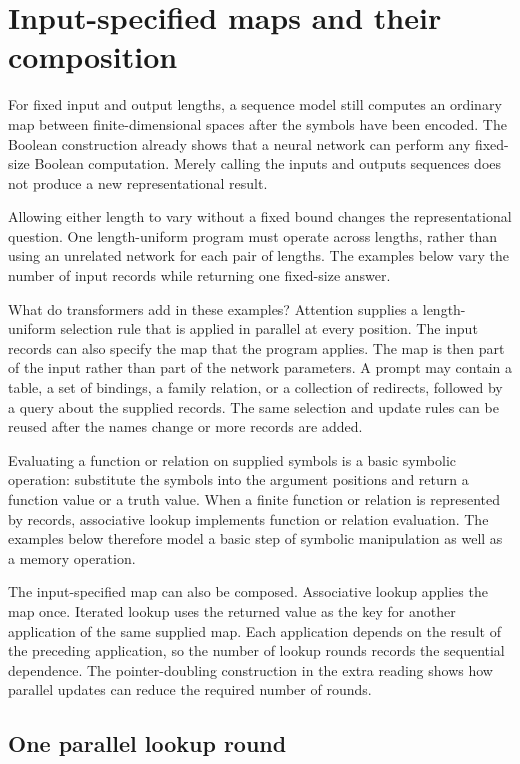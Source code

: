 \documentclass[11pt,twoside]{article}
\theoremstyle{definition}
\theoremstyle{remark}
\begin{document}
\section{Input-specified maps and their composition}
\label{sec:routing}

For fixed input and output lengths, a sequence model still computes an
ordinary map between finite-dimensional spaces after the symbols have been
encoded. The Boolean construction already shows that a neural network can
perform any fixed-size Boolean computation. Merely calling the inputs and
outputs sequences does not produce a new representational result.

Allowing either length to vary without a fixed bound changes the
representational question. One length-uniform program must operate across
lengths, rather than using an unrelated network for each pair of lengths. The
examples below vary the number of input records while returning one fixed-size
answer.

What do transformers add in these examples? Attention supplies a
length-uniform selection rule that is applied in parallel at every position.
The input records can also specify the map that the program applies. The map
is then part of the input rather than part of the network parameters. A prompt
may contain a table, a set of bindings, a family relation, or a collection of
redirects, followed by a query about the supplied records. The same selection
and update rules can be reused after the names change or more records are
added.

Evaluating a function or relation on supplied symbols is a basic symbolic
operation: substitute the symbols into the argument positions and return a
function value or a truth value. When a finite function or relation is
represented by records, associative lookup implements function or relation
evaluation. The examples below therefore model a basic step of symbolic
manipulation as well as a memory operation.

The input-specified map can also be composed. Associative lookup applies the
map once. Iterated lookup uses the returned value as the key for another
application of the same supplied map. Each application depends on the result
of the preceding application, so the number of lookup rounds records the
sequential dependence. The pointer-doubling construction in the extra reading
shows how parallel updates can reduce the required number of rounds.

\subsection{One parallel lookup round}
\end{document}
